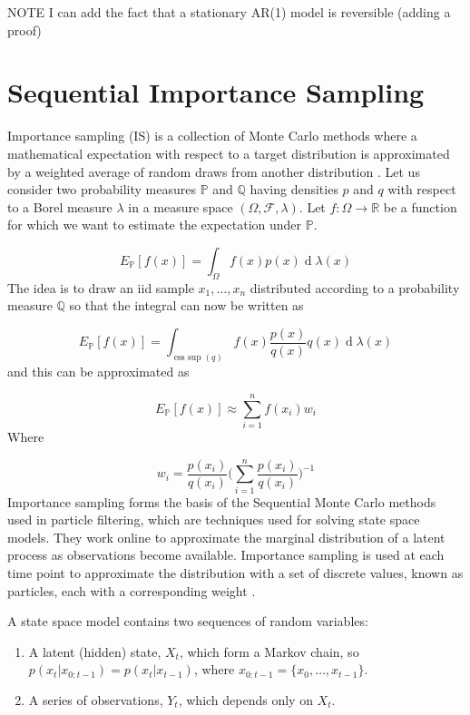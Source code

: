 \documentclass[11pt,a4paper]{article}
\renewcommand{\d}[1]{\ensuremath{\operatorname{d}\!{#1}}}
\DeclareMathOperator*{\esssup}{ess~sup}
\begin{document}
{\color{red} NOTE I can add the fact that a stationary AR(1) model is reversible (adding a proof)} 





\section{Sequential Importance Sampling}

Importance sampling (IS) is a collection of Monte Carlo methods where a mathematical expectation with respect to a target distribution is approximated by a weighted average of random draws from another distribution \cite{Tokdar}.
Let us consider two probability measures $\mathbb{P}$ and $\mathbb{Q}$ having densities $p$ and $q$ with respect to a Borel measure $\lambda$ in a measure space $(\Omega, \mathcal{F} ,\lambda)$. Let $f : \Omega \to \mathbb{R}$ be a function for which we want to estimate the expectation under $\mathbb{P}$.

\[
E_{\mathbb{P}} [ f(x) ] = \int_{\Omega} f(x)p(x)\d \lambda (x)
\]
The idea is to draw an iid sample $x_1, \dots, x_n$ distributed according to a probability measure $\mathbb{Q}$ so that the integral can now be written as

\[
E_{\mathbb{P}} [ f(x) ] = \int_{\esssup(q)} f(x) \frac{p(x)}{q(x)} q(x) \d \lambda (x)
\]
and this can be approximated as

\[
E_{\mathbb{P}} [ f(x) ] \approx \sum_{i = 1}^{n} f(x_i) w_i
\]
Where 

\[
w_i = \frac{p(x_i)}{q(x_i)} \Bigg ( \sum_{i = 1}^{n} \frac{p(x_i)}{q(x_i)}\Bigg)^{-1}
\]
Importance sampling forms the basis of the Sequential Monte Carlo methods used in particle filtering, which are techniques used for solving state space models.
They work online to approximate the marginal distribution of a latent process as observations become available. Importance sampling is used at each time point to approximate the distribution with a set of discrete values, known as particles, each with a corresponding weight \cite{Turner}.

A state space model contains two sequences of random variables:

\begin{enumerate}
	\item A latent (hidden) state, $X_t$, which form a Markov chain, so $p(x_t | x_{0 : t - 1}) = p(x_t | x_{t - 1})$, where $x_{0 : t - 1} = \{ x_0, \dots, x_{t -1}\}$.
	\item A series of observations, $Y_t$, which depends only on $X_t$.
\end{enumerate}
\end{document}
